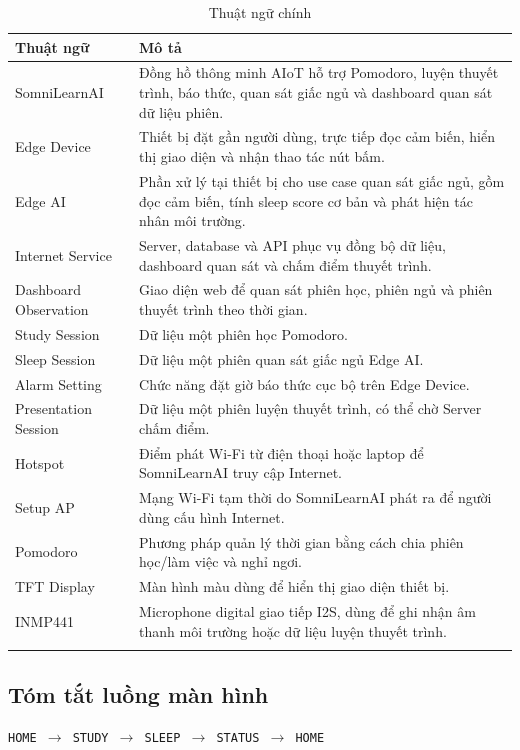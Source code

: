 \documentclass[12pt,a4paper]{article}
\begin{document}
\begin{longtable}{|P{3.2cm}|P{11.2cm}|}
\hline
\textbf{Thuật ngữ} & \textbf{Mô tả} \\
\hline
SomniLearnAI & Đồng hồ thông minh AIoT hỗ trợ Pomodoro, luyện thuyết trình, báo thức, quan sát giấc ngủ và dashboard quan sát dữ liệu phiên. \\
\hline
Edge Device & Thiết bị đặt gần người dùng, trực tiếp đọc cảm biến, hiển thị giao diện và nhận thao tác nút bấm. \\
\hline
Edge AI & Phần xử lý tại thiết bị cho use case quan sát giấc ngủ, gồm đọc cảm biến, tính sleep score cơ bản và phát hiện tác nhân môi trường. \\
\hline
Internet Service & Server, database và API phục vụ đồng bộ dữ liệu, dashboard quan sát và chấm điểm thuyết trình. \\
\hline
Dashboard Observation & Giao diện web để quan sát phiên học, phiên ngủ và phiên thuyết trình theo thời gian. \\
\hline
Study Session & Dữ liệu một phiên học Pomodoro. \\
\hline
Sleep Session & Dữ liệu một phiên quan sát giấc ngủ Edge AI. \\
\hline
Alarm Setting & Chức năng đặt giờ báo thức cục bộ trên Edge Device. \\
\hline
Presentation Session & Dữ liệu một phiên luyện thuyết trình, có thể chờ Server chấm điểm. \\
\hline
Hotspot & Điểm phát Wi-Fi từ điện thoại hoặc laptop để SomniLearnAI truy cập Internet. \\
\hline
Setup AP & Mạng Wi-Fi tạm thời do SomniLearnAI phát ra để người dùng cấu hình Internet. \\
\hline
Pomodoro & Phương pháp quản lý thời gian bằng cách chia phiên học/làm việc và nghỉ ngơi. \\
\hline
TFT Display & Màn hình màu dùng để hiển thị giao diện thiết bị. \\
\hline
INMP441 & Microphone digital giao tiếp I2S, dùng để ghi nhận âm thanh môi trường hoặc dữ liệu luyện thuyết trình. \\
\hline
\caption{Thuật ngữ chính}
\end{longtable}

\subsection{Tóm tắt luồng màn hình}

\begin{center}
\texttt{HOME $\rightarrow$ STUDY $\rightarrow$ SLEEP $\rightarrow$ STATUS $\rightarrow$ HOME}
\end{center}
\end{document}
